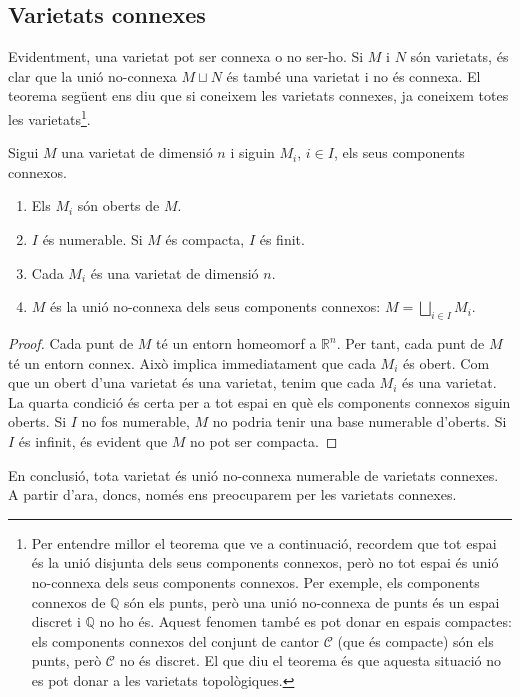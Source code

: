 \documentclass[../main.tex]{subfiles}
\begin{document}
\subsection{Varietats connexes}

Evidentment, una varietat pot ser connexa o no ser-ho. Si $M$ i $N$ són varietats, és clar que la unió no-connexa $M\sqcup N$ és també una varietat i no és connexa. El teorema següent ens diu que si coneixem les varietats connexes, ja coneixem totes les varietats\footnote{Per entendre millor el teorema que ve a continuació, recordem que tot espai és la unió disjunta dels seus components connexos, però no tot espai és unió no-connexa dels seus components connexos. Per exemple, els components connexos de $\mathbb{Q}$ són els punts, però una unió no-connexa de punts és un espai discret i $\mathbb{Q}$ no ho és. Aquest fenomen també es pot donar en espais compactes: els components connexos del conjunt de cantor $\mathcal{C}$ (que és compacte) són els punts, però $\mathcal{C}$ no és discret. El que diu el teorema és que aquesta situació no es pot donar a les varietats topològiques.}.

\begin{ter}
\label{ter:varietatsconnexes} Sigui $M$ una varietat de dimensió $n$ i siguin $M_i$, $i\in I$, els seus components connexos.
\begin{enumerate}[(1)]
    \item Els $M_i$ són oberts de $M$.
    \item $I$ és numerable. Si $M$ és compacta, $I$ és finit.
    \item Cada $M_i$ és una varietat de dimensió $n$.
    \item $M$ és la unió no-connexa dels seus components connexos: $M= \bigsqcup_{i\in I} M_i$.
\end{enumerate}
\end{ter}
\begin{proof}
Cada punt de $M$ té un entorn homeomorf a $\mathbb{R}^n$. Per tant, cada punt de $M$ té un entorn connex. Això implica immediatament que cada $M_i$ és obert. Com que un obert d'una varietat és una varietat, tenim que cada $M_i$ és una varietat. La quarta condició és certa per a tot espai en què els components connexos siguin oberts. Si $I$ no fos numerable, $M$ no podria tenir una base numerable d'oberts. Si $I$ és infinit, és evident que $M$ no pot ser compacta.
\end{proof}

En conclusió, tota varietat és unió no-connexa numerable de varietats connexes. A partir d'ara, doncs, només ens preocuparem per les varietats connexes.
\end{document}
